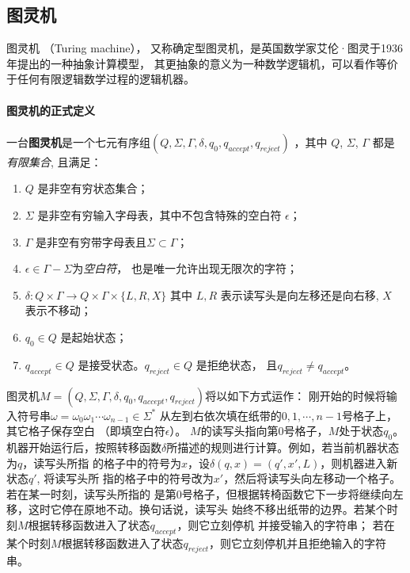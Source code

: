 \subsection{图灵机}
\def\TuringMathDef{(Q, \Sigma, \Gamma, \delta, q_0, q_{accept}, q_{reject})}

图灵机 \cite{doi:10.1112/plms/s2-42.1.230} （Turing machine），
又称确定型图灵机，是英国数学家艾伦·图灵于1936年提出的一种抽象计算模型，
其更抽象的意义为一种数学逻辑机，可以看作等价于任何有限逻辑数学过程的逻辑机器。

\paragraph{图灵机的正式定义}
一台\textbf{图灵机}是一个七元有序组$\TuringMathDef$ ，其中 $Q$, $\Sigma$, $\Gamma$ 都是\emph{有限集合}, 且满足：
\begin{enumerate}
        \item $Q$ 是非空有穷状态集合；
        \item $\Sigma$ 是非空有穷输入字母表，其中不包含特殊的空白符 $\epsilon$；
        \item $\Gamma$ 是非空有穷带字母表且$\Sigma \subset \Gamma$；
        \item $\epsilon \in \Gamma - \Sigma $为\emph{空白符}，
                也是唯一允许出现无限次的字符；
        \item $ \delta: Q \times \Gamma \rightarrow Q \times \Gamma \times \{L,R,X\} $
                其中 $L, R$ 表示读写头是向左移还是向右移, $X$ 表示不移动；
        \item $q_0 \in Q$ 是起始状态；
        \item $q_{accept} \in Q$ 是接受状态。$q_{reject} \in Q$ 是拒绝状态，
                且$q_{reject} \neq q_{accept}$。
\end{enumerate}

图灵机$ M = \TuringMathDef $将以如下方式运作：
刚开始的时候将输入符号串$\omega = \omega_0\omega_1\cdots\omega_{n-1} \in \Sigma^{*}$
从左到右依次填在纸带的$0,1,\cdots,n-1$号格子上，其它格子保存空白 （即填空白符$\epsilon$）。
$M$的读写头指向第0号格子，$M$处于状态$q_0$。
机器开始运行后，按照转移函数$\delta$所描述的规则进行计算。例如，若当前机器状态为$q$，读写头所指
的格子中的符号为$x$，设$\delta(q,x) = (q',x',L)$，则机器进入新状态$q'$, 将读写头所
指的格子中的符号改为$x'$，然后将读写头向左移动一个格子。若在某一时刻，读写头所指的
是第0号格子，但根据转椅函数它下一步将继续向左移，这时它停在原地不动。换句话说，读写头
始终不移出纸带的边界。若某个时刻$M$根据转移函数进入了状态$q_{accept}$，则它立刻停机 并接受输入的字符串；
若在某个时刻$M$根据转移函数进入了状态$q_{reject}$，则它立刻停机并且拒绝输入的字符串。

